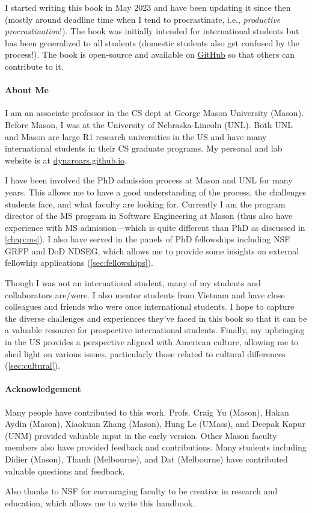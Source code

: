 \documentclass[oneside,11pt,dvipsnames]{book}
\begin{document}
I started writing this book in May 2023 and have been updating it since then (mostly around deadline time when I tend to procrastinate, i.e., \emph{productive procrastination}!). The book was initially intended for international students but has been generalized to all students (domestic students also get confused by the process!).
The book is open-source and available on \href{https://github.com/nguyenthanhvuh/phd-cs-us}{GitHub} so that others can contribute to it.
\paragraph{About Me} I am an associate professor in the CS dept at George Mason University (Mason). Before Mason, I was at the University of Nebraska-Lincoln (UNL). Both UNL and Mason are large R1 research universities in the US and have many international students in their CS graduate programs. My personal and lab website is at \href{https://dynaroars.github.io}{dynaroars.github.io}.

I have been involved the PhD admission process at Mason and UNL for many years. This allows me to have a good understanding of the process, the challenges students face, and what faculty are looking for. Currently I am the program director of the MS program in Software Engineering at Mason (thus also have experience with MS admission---which is quite different than PhD as discussed in \autoref{chap:ms}). I also have served in the panels of PhD fellowships including NSF GRFP and DoD NDSEG, which allows me to provide some insights on external fellowhip applications (\autoref{sec:fellowships}).


Though I was not an international student, many of my students and collaborators are/were. I also mentor students from Vietnam and have close colleagues and friends who were once international students. I hope to capture the diverse challenges and experiences they've faced in this book so that it can be a valuable resource for prospective international students.
Finally, my upbringing in the US provides a perspective aligned with American culture, allowing me to shed light on various issues, particularly those related to cultural differences (\autoref{sec:cultural}).




\paragraph{Acknowledgement} Many people have contributed to this work.
Profs. Craig Yu (Mason), Hakan Aydin (Mason), 
Xiaokuan Zhang (Mason), Hung Le (UMass), and Deepak Kapur (UNM) provided valuable input in the early version. Other Mason faculty members also have provided feedback and contributions.  Many students including Didier (Mason), Thanh (Melbourne), and Dat (Melbourne) have contributed valuable questions and feedback. 

Also thanks to NSF for encouraging faculty to be creative in research and education, which allows me to write this handbook. 



%
%
\end{document}

